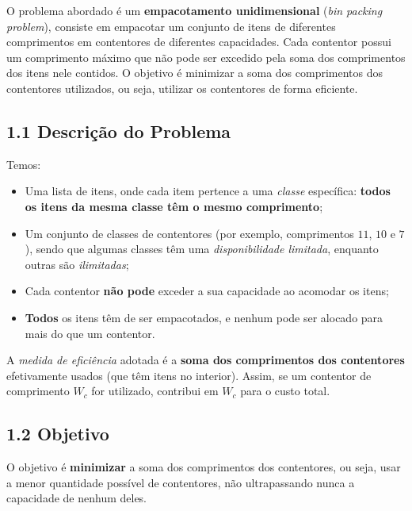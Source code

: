 \documentclass[a4paper,12pt]{article}
\begin{document}
O problema abordado é um \textbf{empacotamento unidimensional} (\emph{bin packing problem}), consiste em empacotar um conjunto de itens de diferentes comprimentos em contentores de diferentes capacidades. Cada contentor possui um comprimento máximo que não pode ser excedido pela soma dos comprimentos dos itens nele contidos. O objetivo é minimizar a soma dos comprimentos dos contentores utilizados, ou seja, utilizar os contentores de forma eficiente.

\subsection*{1.1 Descrição do Problema}
Temos:
\begin{itemize}
  \item Uma lista de itens, onde cada item pertence a uma \emph{classe} específica: \textbf{todos os itens da mesma classe têm o mesmo comprimento};
  \item Um conjunto de classes de contentores (por exemplo, comprimentos $11$, $10$ e $7$), sendo que algumas classes têm uma \emph{disponibilidade limitada}, enquanto outras são \emph{ilimitadas};
  \item Cada contentor \textbf{não pode} exceder a sua capacidade ao acomodar os itens;
  \item \textbf{Todos} os itens têm de ser empacotados, e nenhum pode ser alocado para mais do que um contentor.
\end{itemize}

A \emph{medida de eficiência} adotada é a \textbf{soma dos comprimentos dos contentores} efetivamente usados (que têm itens no interior). Assim, se um contentor de comprimento $W_c$ for utilizado, contribui em $W_c$ para o custo total.

\subsection*{1.2 Objetivo}
O objetivo é \textbf{minimizar} a soma dos comprimentos dos contentores, ou seja, usar a menor quantidade possível de contentores, não ultrapassando nunca a capacidade de nenhum deles.
\end{document}
